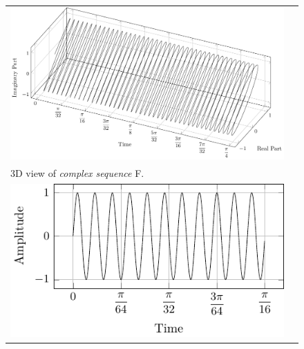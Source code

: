 \documentclass[../../course]{subfiles}
\begin{document}
\begin{figure} [H]

    \renewcommand{\arraystretch}{0.75}
    \centering
    \begin{NiceTabularX} {\textwidth} {
            *{2}{>{\centering\arraybackslash}X}
        }

         {
             {
                \includegraphics[height = \textheight] {tikzpics/plotComplexF.pdf}
            }
        }

        &
        \\

         {
            \vbox{
                 {3D view of \emph{complex sequence} F.}
                \label{plt:cmplxF}
            }
        }

        &
        \\

         {
             {
                \includegraphics[height = \textheight] {tikzpics/plotShortX2.pdf}
            }
        }

        &


\end{NiceTabularX}
\end{figure}
\end{document}
